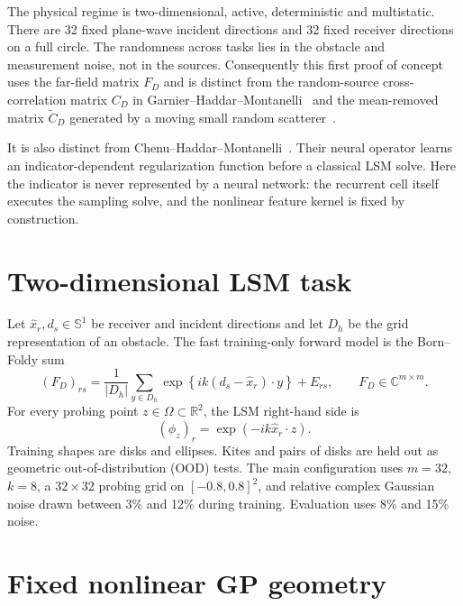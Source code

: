 \documentclass[10pt]{article}
\newcommand{\C}{\mathbb C}
\newcommand{\R}{\mathbb R}
\begin{document}
The physical regime is two-dimensional, active, deterministic and multistatic.
There are 32 fixed plane-wave incident directions and 32 fixed receiver
directions on a full circle.  The randomness across tasks lies in the obstacle
and measurement noise, not in the sources.  Consequently this first proof of
concept uses the far-field matrix $F_D$ and is distinct from the random-source
cross-correlation matrix $C_D$ in Garnier--Haddar--Montanelli~\cite{ghm2023} and
the mean-removed matrix $\widetilde C_D$ generated by a moving small random
scatterer~\cite{ghm2024}.

It is also distinct from Chenu--Haddar--Montanelli~\cite{chm2026}.  Their neural
operator learns an indicator-dependent regularization function before a
classical LSM solve.  Here the indicator is never represented by a neural
network: the recurrent cell itself executes the sampling solve, and the
nonlinear feature kernel is fixed by construction.

\section{Two-dimensional LSM task}

Let $\widehat x_r,d_s\in\mathbb S^1$ be receiver and incident directions and
let $D_h$ be the grid representation of an obstacle.  The fast training-only
forward model is the Born--Foldy sum
\begin{equation}
 (F_D)_{rs}
 =\frac{1}{|D_h|}\sum_{y\in D_h}
 \exp\!\left\{ik(d_s-\widehat x_r)\cdot y\right\}+E_{rs},
 \qquad F_D\in\C^{m\times m}.
 \label{eq:born}
\end{equation}
For every probing point $z\in\Omega\subset\R^2$, the LSM right-hand side is
\begin{equation}
 (\phi_z)_r=\exp(-ik\widehat x_r\cdot z).
\end{equation}
Training shapes are disks and ellipses.  Kites and pairs of disks are held out
as geometric out-of-distribution (OOD) tests.  The main configuration uses
$m=32$, $k=8$, a $32\times32$ probing grid on $[-0.8,0.8]^2$, and relative
complex Gaussian noise drawn between 3\% and 12\% during training.  Evaluation
uses 8\% and 15\% noise.

\section{Fixed nonlinear GP geometry}
\end{document}
